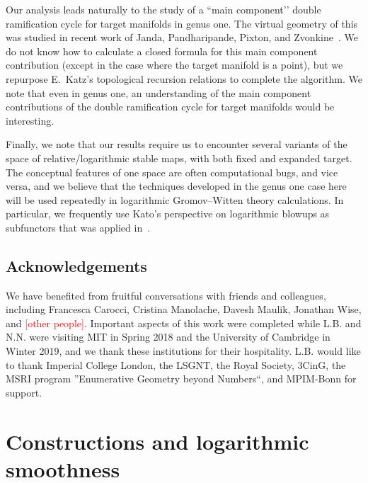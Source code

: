 \documentclass[11pt]{amsart}
\newcommand{\tred}{\textcolor{red}}
\theoremstyle{definition}
\theoremstyle{definition}
\begin{document}
Our analysis leads naturally to the study of a ``main component’’ double ramification cycle for target manifolds in genus one. The virtual geometry of this was studied in recent work of Janda, Pandharipande, Pixton, and Zvonkine~\cite{DRCBundle}. We do not know how to calculate a closed formula for this main component contribution (except in the case where the target manifold is a point), but we repurpose E.~Katz's topological recursion relations \cite{EKatz} to complete the algorithm. We note that even in genus one, an understanding of the main component contributions of the double ramification cycle for target manifolds would be interesting.

Finally, we note that our results require us to encounter several variants of the space of relative/logarithmic stable maps, with both fixed and expanded target. The conceptual features of one space are often computational bugs, and vice versa, and we believe that the techniques developed in the genus one case here will be used repeatedly in logarithmic Gromov--Witten theory calculations. In particular, we frequently use Kato's perspective on logarithmic blowups as subfunctors that was applied in~\cite{RSPW,RSPW2}.

\subsection*{Acknowledgements} We have benefited from fruitful conversations with friends and colleagues, including Francesca Carocci, Cristina Manolache, Davesh Maulik, Jonathan Wise, and \tred{[other people]}. Important aspects of this work were completed while L.B. and N.N. were visiting MIT in Spring 2018 and the University of Cambridge in Winter 2019, and we thank these institutions for their hospitality. L.B. would like to thank Imperial College London, the LSGNT, the Royal Society, 3CinG, the MSRI program ''Enumerative Geometry beyond Numbers``, and MPIM-Bonn for support.


\newpage


\section{Constructions and logarithmic smoothness}\label{section construction}
\end{document}
